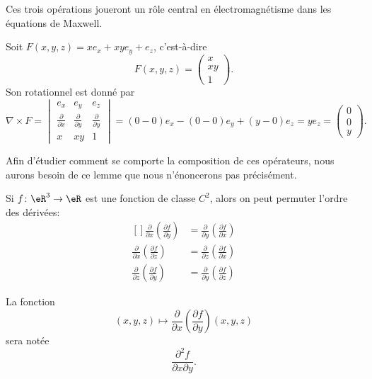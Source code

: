Ces trois opérations joueront un rôle central en électromagnétisme dans les équations de Maxwell.

\begin{example}
    Soit $F(x,y,z)=x e_x+xy e_y+e_z$, c'est-à-dire
    \begin{equation}
        F(x,y,z)=\begin{pmatrix}
            x    \\
            xy    \\
            1
        \end{pmatrix}.
    \end{equation}
    Son rotationnel est donné par
    \begin{equation}
        \nabla\times F=\begin{vmatrix}
            e_x    &   e_y    &   e_z    \\
            \frac{ \partial  }{ \partial x }    &   \frac{ \partial  }{ \partial y }    &   \frac{ \partial  }{ \partial y }    \\
            x    &   xy    &   1
        \end{vmatrix}=
        (0-0)e_x-(0-0)e_y+(y-0)e_z=ye_z=\begin{pmatrix}
            0    \\
            0    \\
            y
        \end{pmatrix}.
    \end{equation}
\end{example}

Afin d'étudier comment se comporte la composition de ces opérateurs, nous aurons besoin de ce lemme que nous n'énoncerons pas précisément.
\begin{lemma}       \label{LemPermDerrxyz}
    Si $f\colon \eR^3\to \eR$ est une fonction de classe $C^2$, alors on peut permuter l'ordre des dérivées:
    \begin{equation}
        \begin{aligned}[]
            \frac{ \partial  }{ \partial x }\left( \frac{ \partial f }{ \partial y } \right)&=\frac{ \partial  }{ \partial y }\left( \frac{ \partial f }{ \partial x } \right)\\
            \frac{ \partial  }{ \partial x }\left( \frac{ \partial f }{ \partial z } \right)&=\frac{ \partial  }{ \partial z }\left( \frac{ \partial f }{ \partial x } \right)\\
            \frac{ \partial  }{ \partial z }\left( \frac{ \partial f }{ \partial y } \right)&=\frac{ \partial  }{ \partial y }\left( \frac{ \partial f }{ \partial z } \right)
        \end{aligned}
    \end{equation}
\end{lemma}
La fonction
\begin{equation}
    (x,y,z)\mapsto\frac{ \partial  }{ \partial x }\left( \frac{ \partial f }{ \partial y } \right)(x,y,z)
\end{equation}
sera notée
\begin{equation}
    \frac{ \partial^2f }{ \partial x\partial y }.
\end{equation}

